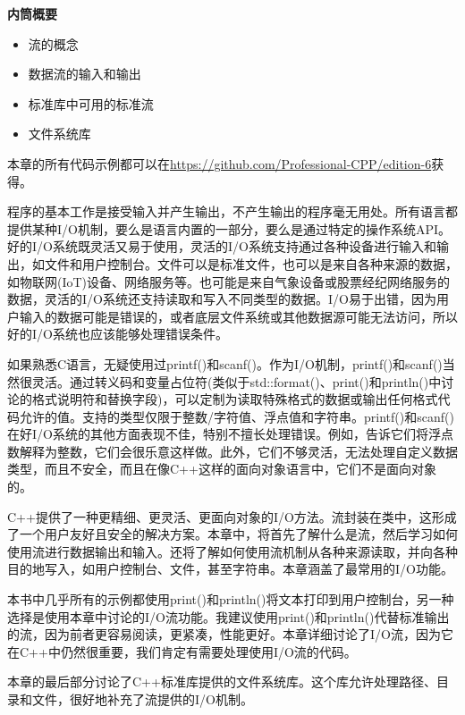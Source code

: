 \noindent
\textbf{内筒概要}

\begin{itemize}
\item
流的概念

\item
数据流的输入和输出

\item
标准库中可用的标准流

\item
文件系统库
\end{itemize}

本章的所有代码示例都可以在\url{https://github.com/Professional-CPP/edition-6}获得。

程序的基本工作是接受输入并产生输出，不产生输出的程序毫无用处。所有语言都提供某种I/O机制，要么是语言内置的一部分，要么是通过特定的操作系统API。好的I/O系统既灵活又易于使用，灵活的I/O系统支持通过各种设备进行输入和输出，如文件和用户控制台。文件可以是标准文件，也可以是来自各种来源的数据，如物联网(IoT)设备、网络服务等。也可能是来自气象设备或股票经纪网络服务的数据，灵活的I/O系统还支持读取和写入不同类型的数据。I/O易于出错，因为用户输入的数据可能是错误的，或者底层文件系统或其他数据源可能无法访问，所以好的I/O系统也应该能够处理错误条件。

如果熟悉C语言，无疑使用过printf()和scanf()。作为I/O机制，printf()和scanf()当然很灵活。通过转义码和变量占位符(类似于std::format()、print()和println()中讨论的格式说明符和替换字段)，可以定制为读取特殊格式的数据或输出任何格式代码允许的值。支持的类型仅限于整数/字符值、浮点值和字符串。printf()和scanf()在好I/O系统的其他方面表现不佳，特别不擅长处理错误。例如，告诉它们将浮点数解释为整数，它们会很乐意这样做。此外，它们不够灵活，无法处理自定义数据类型，而且不安全，而且在像C++这样的面向对象语言中，它们不是面向对象的。

C++提供了一种更精细、更灵活、更面向对象的I/O方法。流封装在类中，这形成了一个用户友好且安全的解决方案。本章中，将首先了解什么是流，然后学习如何使用流进行数据输出和输入。还将了解如何使用流机制从各种来源读取，并向各种目的地写入，如用户控制台、文件，甚至字符串。本章涵盖了最常用的I/O功能。

本书中几乎所有的示例都使用print()和println()将文本打印到用户控制台，另一种选择是使用本章中讨论的I/O流功能。我建议使用print()和println()代替标准输出的流，因为前者更容易阅读，更紧凑，性能更好。本章详细讨论了I/O流，因为它在C++中仍然很重要，我们肯定有需要处理使用I/O流的代码。

本章的最后部分讨论了C++标准库提供的文件系统库。这个库允许处理路径、目录和文件，很好地补充了流提供的I/O机制。










